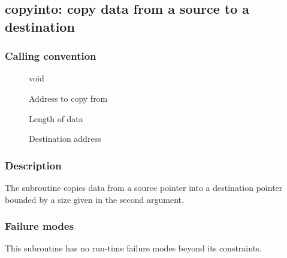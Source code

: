 \clearpage
{}
{}
\label{subr:copyinto}
\subsection*{copyinto: copy data from a source to a destination}

\subsubsection*{Calling convention}

\begin{description}
\item[] void
\item[] Address to copy from
\item[] Length of data
\item[] Destination address
\end{description}

\subsubsection*{Description}

The  subroutine copies data from a source pointer
into a destination pointer bounded by a size given in the second argument.

\subsubsection*{Failure modes}

This subroutine has no run-time failure modes beyond its constraints.
